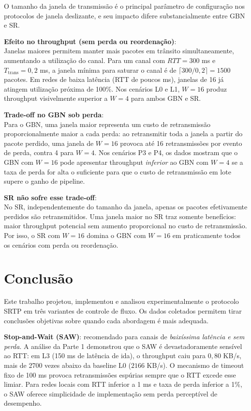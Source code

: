 \documentclass[12pt,a4paper]{article}
\begin{document}
O tamanho da janela de transmissão é o principal parâmetro de configuração nos protocolos de janela deslizante, e seu impacto difere substancialmente entre GBN e SR.

\noindent \textbf{Efeito no throughput (sem perda ou reordenação)}:
\\
Janelas maiores permitem manter mais pacotes em trânsito simultaneamente, aumentando a utilização do canal. Para um canal com $RTT = 300$ ms e $T_{\text{trans}} = 0{,}2$ ms, a janela mínima para saturar o canal é de $\lceil 300/0{,}2 \rceil = 1500$ pacotes. Em redes de baixa latência (RTT de poucos ms), janelas de 16 já atingem utilização próxima de 100\%. Nos cenários L0 e L1, $W = 16$ produz throughput visivelmente superior a $W = 4$ para ambos GBN e SR.

\noindent \textbf{Trade-off no GBN sob perda}:
\\
Para o GBN, uma janela maior representa um custo de retransmissão proporcionalmente maior a cada perda: ao retransmitir toda a janela a partir do pacote perdido, uma janela de $W = 16$ provoca até 16 retransmissões por evento de perda, contra 4 para $W = 4$. Nos cenários P3 e P4, os dados mostram que o GBN com $W = 16$ pode apresentar throughput \emph{inferior} ao GBN com $W = 4$ se a taxa de perda for alta o suficiente para que o custo de retransmissão em lote supere o ganho de pipeline.

\noindent \textbf{SR não sofre esse trade-off}:
\\
No SR, independentemente do tamanho da janela, apenas os pacotes efetivamente perdidos são retransmitidos. Uma janela maior no SR traz somente benefícios: maior throughput potencial sem aumento proporcional no custo de retransmissão. Por isso, o SR com $W = 16$ domina o GBN com $W = 16$ em praticamente todos os cenários com perda ou reordenação.

\section{Conclusão}

Este trabalho projetou, implementou e analisou experimentalmente o protocolo SRTP em três variantes de controle de fluxo. Os dados coletados permitem tirar conclusões objetivas sobre quando cada abordagem é mais adequada.

\noindent \textbf{Stop-and-Wait (SAW)}: recomendado para canais de \emph{baixíssima latência e sem perda}. A análise da Parte 1 demonstrou que o SAW é devastadoramente sensível ao RTT: em L3 (150 ms de latência de ida), o throughput caiu para $0{,}80$ KB/s, mais de 2700 vezes abaixo da baseline L0 ($2166$ KB/s). O mecanismo de timeout fixo de 100 ms provoca retransmissões espúrias sempre que o RTT excede esse limiar. Para redes locais com RTT inferior a 1 ms e taxa de perda inferior a 1\%, o SAW oferece simplicidade de implementação sem perda perceptível de desempenho.
\end{document}
